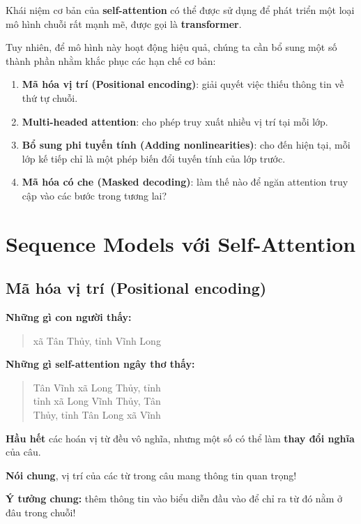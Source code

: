 \documentclass{book}
\begin{document}
    Khái niệm cơ bản của \textbf{self-attention} có thể được sử dụng để phát triển một loại mô hình chuỗi rất mạnh mẽ, được gọi là \textbf{transformer}.
    
    Tuy nhiên, để mô hình này hoạt động hiệu quả, chúng ta cần bổ sung một số thành phần nhằm khắc phục các hạn chế cơ bản:
    
    \begin{enumerate}
        \item \textbf{Mã hóa vị trí (Positional encoding)}: giải quyết việc thiếu thông tin về thứ tự chuỗi.
        \item \textbf{Multi-headed attention}: cho phép truy xuất nhiều vị trí tại mỗi lớp.
        \item \textbf{Bổ sung phi tuyến tính (Adding nonlinearities)}: cho đến hiện tại, mỗi lớp kế tiếp chỉ là một phép biến đổi tuyến tính của lớp trước.
        \item \textbf{Mã hóa có che (Masked decoding)}: làm thế nào để ngăn attention truy cập vào các bước trong tương lai?
    \end{enumerate}
\section{Sequence Models với Self-Attention}
    \subsection{Mã hóa vị trí (Positional encoding)}
    \textbf{Những gì con người thấy:}
    \begin{quote}
        xã Tân Thủy, tỉnh Vĩnh Long
    \end{quote}
    
    \textbf{Những gì self-attention ngây thơ thấy:}
    \begin{quote}
        Tân Vĩnh xã Long Thủy, tỉnh \\
        tỉnh xã Long Vĩnh Thủy, Tân \\
        Thủy, tỉnh Tân Long xã Vĩnh
    \end{quote}
    
    \textbf{Hầu hết} các hoán vị từ đều vô nghĩa, nhưng một số có thể làm \textbf{thay đổi nghĩa} của câu.
    
    \textbf{Nói chung}, vị trí của các từ trong câu mang thông tin quan trọng!
    
    \vspace{0.5em}
    \textbf{Ý tưởng chung:} thêm thông tin vào biểu diễn đầu vào để chỉ ra từ đó nằm ở đâu trong chuỗi!
    
\end{document}
